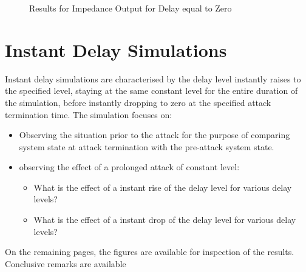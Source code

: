 \begin{figure}[H]
\begin{tabular}{c}
  \end{tabular}
\caption{Results for Impedance Output for Delay equal to Zero }


\label{fig:ImpedanceZeroDelay}
\end{figure}









\section{Instant Delay Simulations}
Instant delay simulations are characterised by the delay level instantly raises to the specified level, staying at the same constant level for the entire duration of the simulation, before instantly dropping to zero at the specified attack termination time.
The simulation focuses on:
\begin{itemize}
    \item Observing the situation prior to the attack for the purpose of comparing system state at attack termination with the pre-attack system state.
    \item observing the effect of a prolonged attack of constant level:
    \begin{itemize}
        \item What is the effect of a instant rise of the delay level for various delay levels?
        \item What is the effect of a instant drop of the delay level for various delay levels?
    \end{itemize}
\end{itemize}

On the remaining pages, the figures are available for inspection of the results. Conclusive remarks are available 








